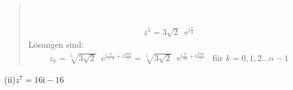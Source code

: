 \begin{quote}
\begin{center}
\\
\end{center}
\begin{align*}
z^5=3\sqrt{2}\;\;\mathrm{e}^{\mathrm{i}\frac{\pi}{4}}
\end{align*}
Lösungen sind:\\
\begin{align*}
z_k=\sqrt[5]{\scriptscriptstyle 3\sqrt{2}}\;\;\mathrm{e}^{\mathrm{i}\frac{\pi}{5\cdot4}+\mathrm{i}\frac{2\pi k}{5}}=\sqrt[5]{\scriptscriptstyle 3\sqrt{2}}\;\;\mathrm{e}^{\mathrm{i}\frac{\pi}{20}+\mathrm{i}\frac{2\pi k}{5}}\;\;\;\text{für } k=0,1,2\ldots n-1
\end{align*}
\end{quote}
(ii)\;\;$ z^7=16\mathrm{i}-16 $\\
